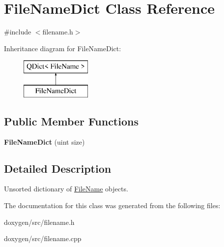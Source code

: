 \hypertarget{class_file_name_dict}{}\section{File\+Name\+Dict Class Reference}
\label{class_file_name_dict}


{\ttfamily \#include $<$filename.\+h$>$}

Inheritance diagram for File\+Name\+Dict\+:\begin{figure}[H]
\begin{center}
\leavevmode
\includegraphics[height=2.000000cm]{class_file_name_dict}
\end{center}
\end{figure}
\subsection*{Public Member Functions}
\begin{DoxyCompactItemize}
\item 
\mbox{\label{class_file_name_dict_a956ea6b2e4c5d9ba05c5269c79437731}} 
{\bfseries File\+Name\+Dict} (uint size)
\end{DoxyCompactItemize}


\subsection{Detailed Description}
Unsorted dictionary of \mbox{\hyperlink{class_file_name}{File\+Name}} objects. 

The documentation for this class was generated from the following files\+:\begin{DoxyCompactItemize}
\item 
doxygen/src/filename.\+h\item 
doxygen/src/filename.\+cpp\end{DoxyCompactItemize}
